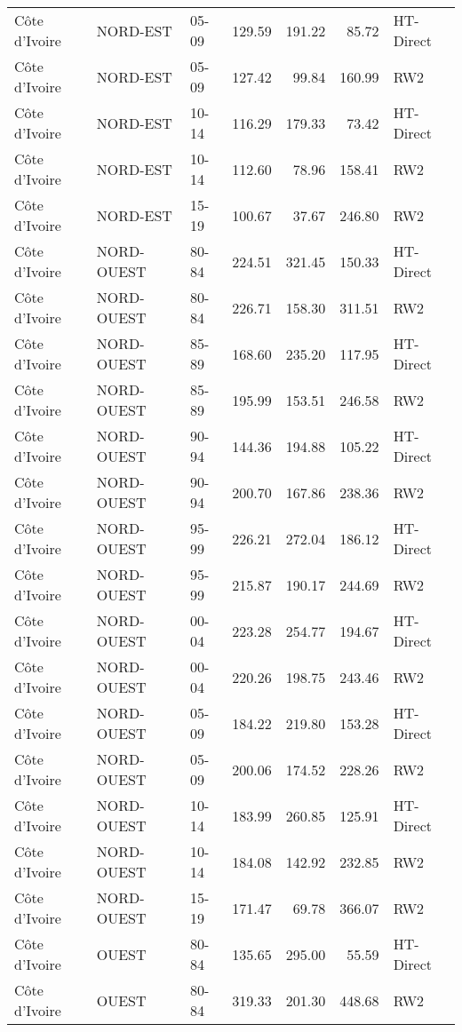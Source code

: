 \begin{longtable}{lllrrrl}
  C\^{o}te d'Ivoire & NORD-EST & 05-09 & 129.59 & 191.22 & 85.72 & HT-Direct \\ 
  C\^{o}te d'Ivoire & NORD-EST & 05-09 & 127.42 & 99.84 & 160.99 & RW2 \\ 
  C\^{o}te d'Ivoire & NORD-EST & 10-14 & 116.29 & 179.33 & 73.42 & HT-Direct \\ 
  C\^{o}te d'Ivoire & NORD-EST & 10-14 & 112.60 & 78.96 & 158.41 & RW2 \\ 
  C\^{o}te d'Ivoire & NORD-EST & 15-19 & 100.67 & 37.67 & 246.80 & RW2 \\ 
  C\^{o}te d'Ivoire & NORD-OUEST & 80-84 & 224.51 & 321.45 & 150.33 & HT-Direct \\ 
  C\^{o}te d'Ivoire & NORD-OUEST & 80-84 & 226.71 & 158.30 & 311.51 & RW2 \\ 
  C\^{o}te d'Ivoire & NORD-OUEST & 85-89 & 168.60 & 235.20 & 117.95 & HT-Direct \\ 
  C\^{o}te d'Ivoire & NORD-OUEST & 85-89 & 195.99 & 153.51 & 246.58 & RW2 \\ 
  C\^{o}te d'Ivoire & NORD-OUEST & 90-94 & 144.36 & 194.88 & 105.22 & HT-Direct \\ 
  C\^{o}te d'Ivoire & NORD-OUEST & 90-94 & 200.70 & 167.86 & 238.36 & RW2 \\ 
  C\^{o}te d'Ivoire & NORD-OUEST & 95-99 & 226.21 & 272.04 & 186.12 & HT-Direct \\ 
  C\^{o}te d'Ivoire & NORD-OUEST & 95-99 & 215.87 & 190.17 & 244.69 & RW2 \\ 
  C\^{o}te d'Ivoire & NORD-OUEST & 00-04 & 223.28 & 254.77 & 194.67 & HT-Direct \\ 
  C\^{o}te d'Ivoire & NORD-OUEST & 00-04 & 220.26 & 198.75 & 243.46 & RW2 \\ 
  C\^{o}te d'Ivoire & NORD-OUEST & 05-09 & 184.22 & 219.80 & 153.28 & HT-Direct \\ 
  C\^{o}te d'Ivoire & NORD-OUEST & 05-09 & 200.06 & 174.52 & 228.26 & RW2 \\ 
  C\^{o}te d'Ivoire & NORD-OUEST & 10-14 & 183.99 & 260.85 & 125.91 & HT-Direct \\ 
  C\^{o}te d'Ivoire & NORD-OUEST & 10-14 & 184.08 & 142.92 & 232.85 & RW2 \\ 
  C\^{o}te d'Ivoire & NORD-OUEST & 15-19 & 171.47 & 69.78 & 366.07 & RW2 \\ 
  C\^{o}te d'Ivoire & OUEST & 80-84 & 135.65 & 295.00 & 55.59 & HT-Direct \\ 
  C\^{o}te d'Ivoire & OUEST & 80-84 & 319.33 & 201.30 & 448.68 & RW2 \\ 

\end{longtable}
